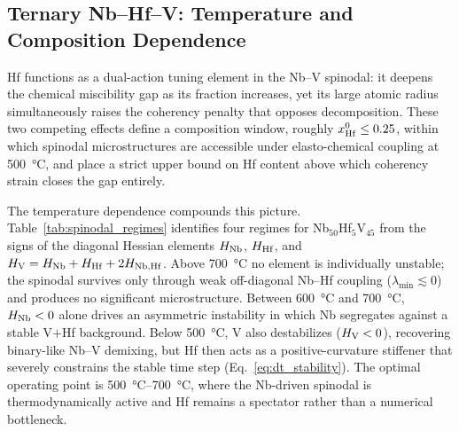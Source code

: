 \subsection{Ternary Nb--Hf--V: Temperature and Composition Dependence}
\label{sec:ternary}

{\color{blue}
Hf functions as a dual-action tuning element in the Nb--V spinodal: it deepens the chemical miscibility gap as its fraction increases, yet its large atomic radius simultaneously raises the coherency penalty that opposes decomposition.
These two competing effects define a composition window, roughly $x_{\rm Hf}^0 \leq 0.25$, within which spinodal microstructures are accessible under elasto-chemical coupling at \SI{500}{\celsius}, and place a strict upper bound on Hf content above which coherency strain closes the gap entirely.

The temperature dependence compounds this picture.
Table~\ref{tab:spinodal_regimes} identifies four regimes for Nb$_{50}$Hf$_5$V$_{45}$ from the signs of the diagonal Hessian elements $H_{\rm Nb}$, $H_{\rm Hf}$, and $H_{\rm V} = H_{\rm Nb} + H_{\rm Hf} + 2H_{\rm Nb,Hf}$.
Above \SI{700}{\celsius} no element is individually unstable; the spinodal survives only through weak off-diagonal Nb--Hf coupling ($\lambda_{\min} \lesssim 0$) and produces no significant microstructure.
Between \SI{600}{\celsius} and \SI{700}{\celsius}, $H_{\rm Nb} < 0$ alone drives an asymmetric instability in which Nb segregates against a stable V$+$Hf background.
Below \SI{500}{\celsius}, V also destabilizes ($H_{\rm V} < 0$), recovering binary-like Nb--V demixing, but Hf then acts as a positive-curvature stiffener that severely constrains the stable time step (Eq.~\ref{eq:dt_stability}).
The optimal operating point is \SI{500}{\celsius}--\SI{700}{\celsius}, where the Nb-driven spinodal is thermodynamically active and Hf remains a spectator rather than a numerical bottleneck.
}

